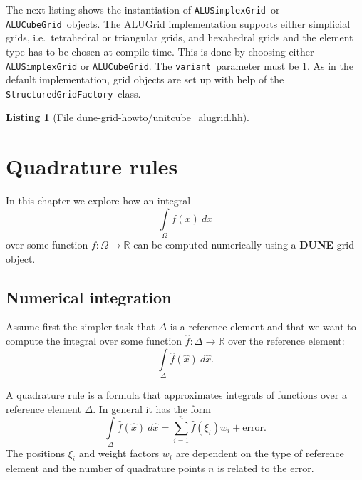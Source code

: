 \documentclass[11pt,a4paper,headinclude,footinclude,DIV16,normalheadings]{scrreprt}
\newcommand{\Dune}{{\sf\bfseries DUNE}\xspace}
\newtheorem{lst}{Listing}
\begin{document}
The next listing shows the instantiation of \lstinline!ALUSimplexGrid!\ or 
\lstinline!ALUCubeGrid!\ objects. 
The ALUGrid implementation supports either simplicial grids, i.e.\ 
tetrahedral or triangular grids, and hexahedral grids and the
element type has to be chosen at compile-time. This is done by choosing 
either \lstinline!ALUSimplexGrid! or \lstinline!ALUCubeGrid!. 
The \lstinline!variant!\ parameter must be 1. 
As in the default implementation, grid objects are set up with help of the
\lstinline!StructuredGridFactory!\ class.

\begin{lst}[File dune-grid-howto/unitcube\_alugrid.hh] \mbox{}
\nopagebreak

\end{lst}






\chapter{Quadrature rules}
\label{sec:quadrature}

In this chapter we explore how an integral $$\int\limits_{\Omega} f(x)\ dx$$
over some function $f:\Omega\to\mathbb{R}$ can be computed numerically
using a \Dune{} grid object.

\section{Numerical integration}

Assume first the simpler task that $\Delta$ is a reference element 
and that we want to
compute the integral over some function $\hat{f}:\Delta\to\mathbb{R}$
over the reference element:$$\int\limits_{\Delta} \hat{f}(\hat{x})\ d\hat{x}.$$


A quadrature rule is a formula that approximates integrals of
functions over a reference element $\Delta$. In general it has the form
$$\int\limits_{\Delta} \hat{f}(\hat{x})\ d\hat{x} = \sum_{i=1}^n
\hat{f}(\xi_i) w_i + \text{error}.$$
The positions $\xi_i$ and weight factors $w_i$ are dependent on the
type of reference element and the number of quadrature points $n$ is
related to the error.
\end{document}
